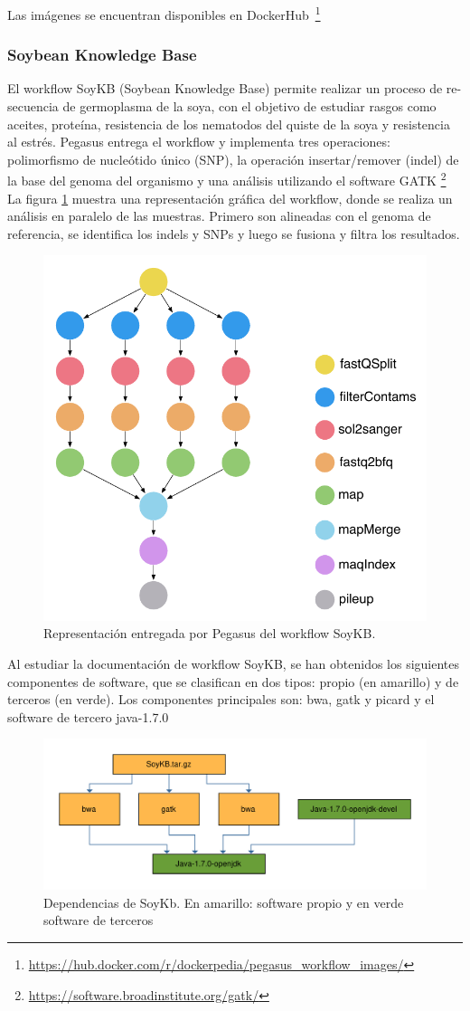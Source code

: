 Las imágenes se encuentran disponibles en DockerHub~\footnote{\url{https://hub.docker.com/r/dockerpedia/pegasus_workflow_images/}}

\subsubsection{Soybean Knowledge Base}

El workflow SoyKB (Soybean Knowledge Base) \cite{joshi2012soybean} permite realizar un proceso de re-secuencia de germoplasma de la soya, con el objetivo de estudiar rasgos como aceites, proteína, resistencia de los nematodos del quiste de la soya y resistencia al estrés.
Pegasus entrega el workflow y implementa tres operaciones: polimorfismo de nucleótido único (SNP), la operación insertar/remover (indel) de la base del genoma del organismo y una análisis utilizando el software GATK \footnote{\url{https://software.broadinstitute.org/gatk/}}
La figura \ref{fig:soykb} muestra una representación gráfica del workflow, donde se realiza un análisis en paralelo de las muestras. Primero son alineadas con el genoma de referencia,  se identifica los indels y SNPs y luego se fusiona y filtra los resultados. 

\begin{figure}[t]
\centering
\includegraphics[width=.5\textwidth]{Figures/workflow-genome}
\caption[Representación workflow: SoyKb]{Representación entregada por Pegasus del workflow SoyKB.}\label{fig:soykb}
\end{figure}

Al estudiar la documentación de workflow SoyKB, se han obtenidos los siguientes componentes de software, que se clasifican en dos tipos: propio (en amarillo) y de terceros (en verde). Los componentes principales son: bwa, gatk y picard y el software de tercero java-1.7.0

\begin{figure}[t]
\centering
\includegraphics[width=.8\textwidth]{Figures/soykb-deps}
\caption[Dependencias workflow SoyKb]{Dependencias de SoyKb. En amarillo: software propio y en verde software de terceros}\label{fig:soykb-deps} 
\end{figure}


